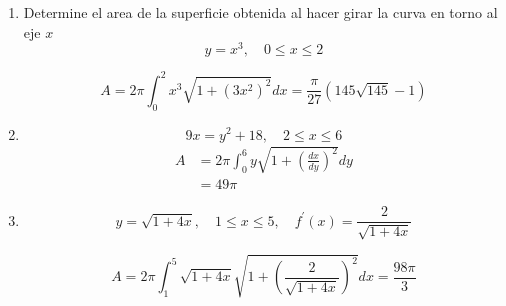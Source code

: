 \documentclass{report}
\begin{document}
\begin{enumerate}[label=\textcolor{Red}{\textbf{\arabic*.}}]
\begin{enumerate}[label=\textcolor{OliveGreen}{\textbf{\arabic*.}}]
            \item Determine el area de la superficie obtenida al hacer girar la curva en torno al eje $x$
            $$y=x^{3}, \quad 0 \leq x \leq 2 $$

            $$A=2 \pi \int_{0}^{2} x^{3} \sqrt{1+\left(3 x^{2}\right)^{2}} dx = \frac{\pi}{27}(145 \sqrt{145}-1)$$

            \item $$
            9 x=y^{2}+18, \quad 2 \leq x \leq 6
            $$
            \begin{align*}
                A &= 2 \pi \int_{0}^{6} y \sqrt{1+\left(\frac{d x}{d y}\right)^{2}} d y \\
                &= 49\pi
            \end{align*}

            \item $$y=\sqrt{1+4 x}, \quad 1 \leq x \leq 5, \quad f^{\prime}(x)=\frac{2}{\sqrt{1+4 x}}$$
            
            $$A =2 \pi \int_{1}^{5} \sqrt{1+4 x} \sqrt{1+\left(\frac{2}{\sqrt{1+4 x}}\right)^{2}} dx = \frac{98\pi}{3}$$
        \end{enumerate}
    \end{enumerate}
\end{document}
